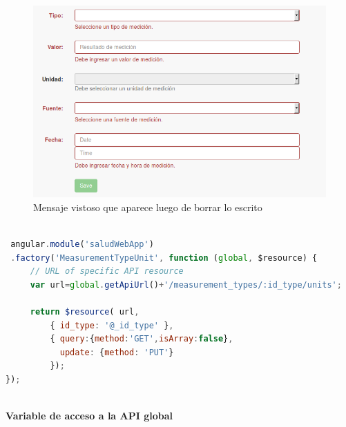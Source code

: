 \documentclass[a4paper,12pt]{article}
\begin{document}
\begin{figure}[h!]
  \centering
  \includegraphics[width=.8\textwidth]{img/3-escribir_borrar}
  \caption{Mensaje vistoso que aparece luego de borrar lo escrito}
  \label{msj_escribir_borrar}
\end{figure}

\clearpage

\begin{lstlisting}[language=JavaScript, caption= recurso que solicita las unidades de un tipo de medición específico, label=type_unit]

 angular.module('saludWebApp')                                                   
 .factory('MeasurementTypeUnit', function (global, $resource) {                  
     // URL of specific API resource                                             
     var url=global.getApiUrl()+'/measurement_types/:id_type/units';             
                                                                                 
     return $resource( url,                                                      
         { id_type: '@_id_type' },                                                        
         { query:{method:'GET',isArray:false},                                   
           update: {method: 'PUT'}                                               
         });                                                                     
}); 
                                                                            
\end{lstlisting}



\textbf{Variable de acceso a la API global}
\end{document}
